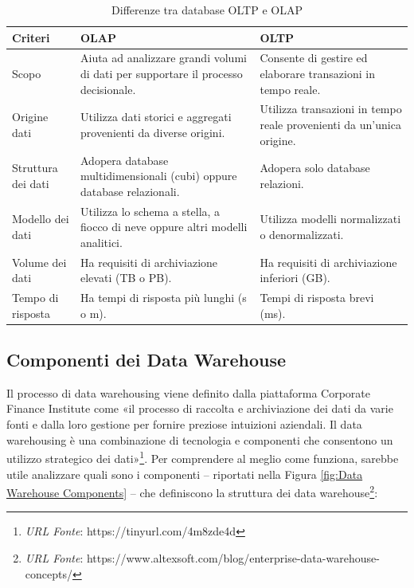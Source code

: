 \begin{longtable}{|p{4cm}|p{5cm}|p{5cm}|}
    \caption{Differenze tra database OLTP e OLAP}
    \label{tab:oltp_vs_olap}\\
    \hline
    \textbf{Criteri} & \textbf{OLAP} & \textbf{OLTP}\\
    \hline
    \endfirsthead 
        Scopo & Aiuta ad analizzare grandi volumi di dati per supportare il processo decisionale. & Consente di gestire ed elaborare transazioni in tempo reale.\\
        \hline
        Origine dati & Utilizza dati storici e aggregati provenienti da diverse origini. & Utilizza transazioni in tempo reale provenienti da un'unica origine.\\
        \hline
        Struttura dei dati & Adopera database multidimensionali (cubi) oppure database relazionali. & Adopera solo database relazioni.\\
        \hline
        Modello dei dati & Utilizza lo schema a stella, a fiocco di neve oppure altri modelli analitici. & Utilizza modelli normalizzati o denormalizzati.\\
        \hline
        Volume dei dati & Ha requisiti di archiviazione elevati (TB o PB). & Ha requisiti di archiviazione inferiori (GB).\\
        \hline
        Tempo di risposta & Ha tempi di risposta più lunghi (s o m). & Tempi di risposta brevi (ms).\\
    \hline
    
\end{longtable}

\subsection{Componenti dei Data Warehouse}
Il processo di data warehousing viene definito dalla piattaforma Corporate Finance Institute come «il processo di raccolta e archiviazione dei dati da varie fonti e dalla loro gestione per fornire preziose intuizioni aziendali. Il data warehousing è una combinazione di tecnologia e componenti che consentono un utilizzo strategico dei dati»\footnote{\textit{URL Fonte}: https://tinyurl.com/4m8zde4d}. Per comprendere al meglio come funziona, sarebbe utile analizzare quali sono i componenti -- riportati nella Figura \ref{fig:Data Warehouse Components} -- che definiscono la struttura dei data warehouse\footnote{\textit{URL Fonte}: https://www.altexsoft.com/blog/enterprise-data-warehouse-concepts/}:

